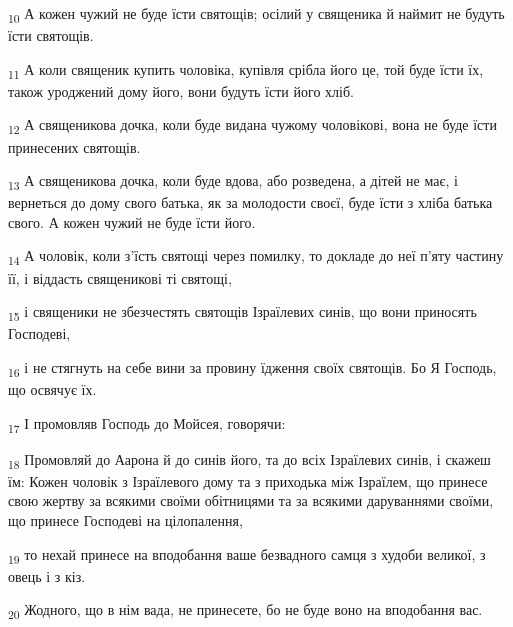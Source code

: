 \begin{tcolorbox}
\textsubscript{10} А кожен чужий не буде їсти святощів; осілий у священика й наймит не будуть їсти святощів.
\end{tcolorbox}
\begin{tcolorbox}
\textsubscript{11} А коли священик купить чоловіка, купівля срібла його це, той буде їсти їх, також уроджений дому його, вони будуть їсти його хліб.
\end{tcolorbox}
\begin{tcolorbox}
\textsubscript{12} А священикова дочка, коли буде видана чужому чоловікові, вона не буде їсти принесених святощів.
\end{tcolorbox}
\begin{tcolorbox}
\textsubscript{13} А священикова дочка, коли буде вдова, або розведена, а дітей не має, і вернеться до дому свого батька, як за молодости своєї, буде їсти з хліба батька свого. А кожен чужий не буде їсти його.
\end{tcolorbox}
\begin{tcolorbox}
\textsubscript{14} А чоловік, коли з'їсть святощі через помилку, то докладе до неї п'яту частину її, і віддасть священикові ті святощі,
\end{tcolorbox}
\begin{tcolorbox}
\textsubscript{15} і священики не збезчестять святощів Ізраїлевих синів, що вони приносять Господеві,
\end{tcolorbox}
\begin{tcolorbox}
\textsubscript{16} і не стягнуть на себе вини за провину їдження своїх святощів. Бо Я Господь, що освячує їх.
\end{tcolorbox}
\begin{tcolorbox}
\textsubscript{17} І промовляв Господь до Мойсея, говорячи:
\end{tcolorbox}
\begin{tcolorbox}
\textsubscript{18} Промовляй до Аарона й до синів його, та до всіх Ізраїлевих синів, і скажеш їм: Кожен чоловік з Ізраїлевого дому та з приходька між Ізраїлем, що принесе свою жертву за всякими своїми обітницями та за всякими даруваннями своїми, що принесе Господеві на цілопалення,
\end{tcolorbox}
\begin{tcolorbox}
\textsubscript{19} то нехай принесе на вподобання ваше безвадного самця з худоби великої, з овець і з кіз.
\end{tcolorbox}
\begin{tcolorbox}
\textsubscript{20} Жодного, що в нім вада, не принесете, бо не буде воно на вподобання вас.
\end{tcolorbox}
